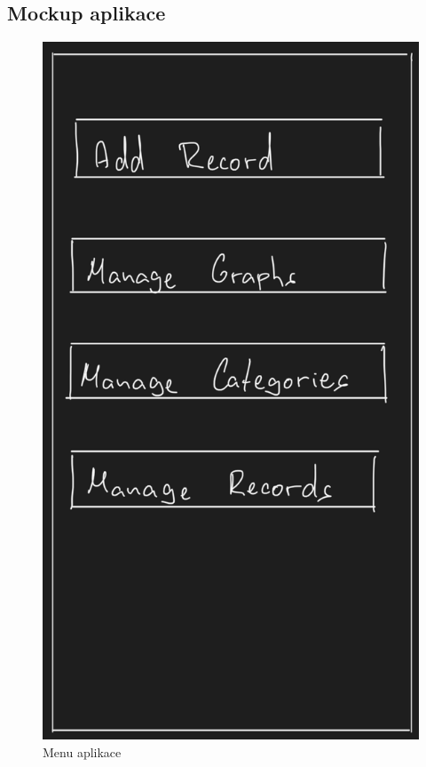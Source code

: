 \documentclass[12pt, titlepage]{article}
\begin{document}
	\subsection{Mockup aplikace}
\begin{figure}[ht]
	\centering
	\includegraphics[scale=0.43]{menu_screen}
	\caption{Menu aplikace}
	\label{fig:menu_screen}
\end{figure}
\end{document}
